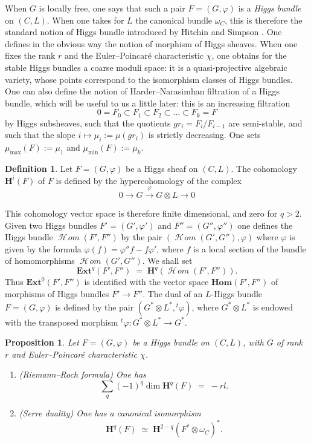\documentclass[12pt,english]{smfart}%
\theoremstyle{plain}
\newtheorem{proposition}[theorem]{Proposition}
\theoremstyle{definition}
\newtheorem{definition}[theorem]{Definition}
\theoremstyle{remark}
\newcommand{\Homsh}{\mathop{\mathcal{H}\!\mathit{om}}\nolimits}
\newcommand{\BHom}{\mathbf{Hom}}
\newcommand{\BExt}{\mathbf{Ext}}
\begin{document}
When $G$ is locally free, one says that such a pair $F=(G,\varphi)$ is a \emph{Higgs bundle} on $(C,L)$. When one takes for $L$ the canonical bundle $\omega_{C}$, this is therefore the standard notion of Higgs bundle introduced by Hitchin \cite{Hit} and Simpson \cite{Sim2,Sim1}. One defines in the obvious way the notion of morphism of Higgs sheaves. When one fixes the rank $r$ and the Euler--Poincar\'e characteristic $\chi$, one obtains for the stable Higgs bundles a coarse moduli space: it is a quasi-projective algebraic variety, whose points correspond to the isomorphism classes of Higgs bundles. One can also define the notion of Harder--Narasimhan filtration of a Higgs bundle, which will be useful to us a little later: this is an increasing filtration
\[
0 = F_{0} \subset F_{1} \subset F_{2} \subset \dots \subset F_{k} = F
\]
by Higgs subsheaves, such that the quotients $gr_{i}=F_{i}/F_{i-1}$ are semi-stable, and such that the slope $i\mapsto\mu_{i}:=\mu(gr_{i})$ is strictly decreasing. One sets $\mu_{\max}(F):=\mu_{1}$ and $\mu_{\min}(F):=\mu_{k}$.

\begin{definition}\label{def:higgs-cohom}
Let $F=(G,\varphi)$ be a Higgs sheaf on $(C,L)$. The cohomology $\mathbf{H}^{i}(F)$ of $F$ is defined by the hypercohomology of the complex
\[
0 \longrightarrow G \stackrel{\varphi}{\longrightarrow} G\otimes L \longrightarrow 0
\]
\end{definition}

This cohomology vector space is therefore finite dimensional, and zero for $q>2$. Given two Higgs bundles $F'=(G',\varphi')$ and $F''=(G'',\varphi'')$ one defines the Higgs bundle $\Homsh(F',F'')$ by the pair $(\Homsh(G',G''),\varphi)$ where $\varphi$ is given by the formula $\varphi(f)=\varphi''f-f\varphi'$, where $f$ is a local section of the bundle of homomorphisms $\Homsh(G',G'')$. We shall set
\[
\BExt^{q}(F',F'') \;=\; \mathbf{H}^{q}(\Homsh(F',F'')).
\]
Thus $\BExt^{0}(F',F'')$ is identified with the vector space $\BHom(F',F'')$ of morphisms of Higgs bundles $F'\to F''$. The dual of an $L$-Higgs bundle $F=(G,\varphi)$ is defined by the pair $(G^{*}\otimes L^{*},{}^{t}\varphi)$, where $G^{*}\otimes L^{*}$ is endowed with the transposed morphism ${}^{t}\varphi:G^{*}\otimes L^{*}\to G^{*}$.

\begin{proposition}\label{prop:higgs-RR}
Let $F=(G,\varphi)$ be a Higgs bundle on $(C,L)$, with $G$ of rank $r$ and Euler--Poincar\'e characteristic $\chi$.
\begin{enumerate}
\item[(1)] \emph{(Riemann--Roch formula)} One has
\[
\sum_{q}(-1)^{q}\dim \mathbf{H}^{q}(F) \;=\; -rl.
\]
\item[(2)] \emph{(Serre duality)} One has a canonical isomorphism
\[
\mathbf{H}^{q}(F) \;\simeq\; \mathbf{H}^{2-q}(F^{*}\otimes\omega_{C})^{*}.
\]
\end{enumerate}
\end{proposition}
\end{document}
